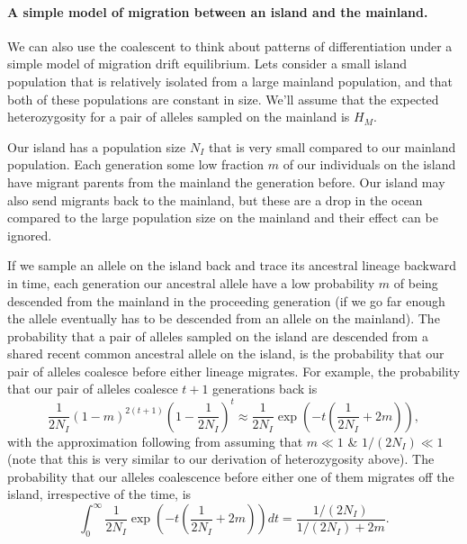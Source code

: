 \paragraph{A simple model of migration between an island and the mainland.}
We can also use the coalescent to think about patterns of
differentiation under a simple model of migration drift
equilibrium. Lets consider a small island population that is relatively isolated
from a large mainland population, and that both of these populations
are constant in size. We'll assume that the expected heterozygosity
for a pair of alleles sampled on the mainland is $H_M$.

Our island has a population size
$N_{I}$ that is very small compared to our mainland population.
Each generation some low fraction $m$ of our individuals on the
island have migrant parents from the mainland the generation
before. Our island may also send migrants back to the mainland, but
these are a drop in the ocean compared to the large population size on
the mainland and their effect can be ignored. 


If we sample an allele on the island back and trace its ancestral
lineage backward in time, each generation our ancestral allele have a low
probability $m$ of being descended from the mainland in the proceeding
generation (if we go far enough the allele eventually has to be
descended from an allele on the mainland). The probability that a pair of alleles sampled on the
island are descended from a shared recent common ancestral allele on the island, is the
probability that our pair of alleles coalesce before either lineage
migrates. For example, the probability that our pair of alleles
coalesce $t+1$ generations back is 
\begin{equation}
\frac{1}{2N_I}(1-m)^{2(t+1)} \left(1-\frac{1}{2N_I} \right)^{t} \approx
\frac{1}{2N_I} \exp\left( -t\left (\frac{1}{2N_I} + 2m\right) \right),
\end{equation}
with the approximation following from assuming that $m \ll 1$ \& $1/(2N_I)
\ll 1$ (note that this is very similar to our derivation of
heterozygosity above). The probability that our alleles coalescence before either one
of them migrates off the island, irrespective of the time, is
\begin{equation}
\int_0^{\infty} \frac{1}{2N_I} \exp\left( -t\left (\frac{1}{2N_I} +
    2m\right) \right) dt = \frac{1/(2N_I) }{1/(2N_I) +
    2m}.
\end{equation}


